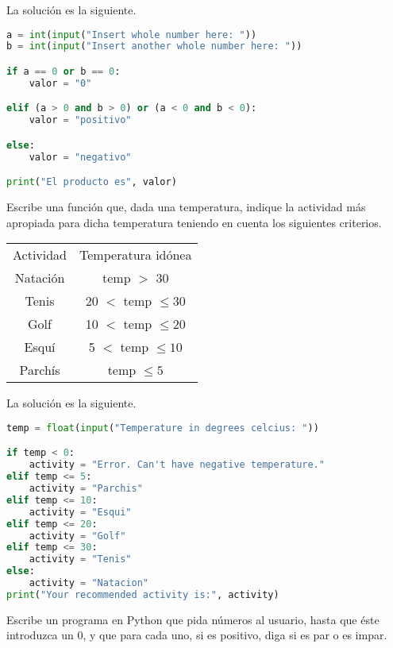 \documentclass{article}
\begin{document}
\begin{sol}
La solución es la siguiente.
\begin{lstlisting}[language = Python]
a = int(input("Insert whole number here: "))
b = int(input("Insert another whole number here: "))

if a == 0 or b == 0: 
	valor = "0"

elif (a > 0 and b > 0) or (a < 0 and b < 0):
	valor = "positivo"

else:
	valor = "negativo"

print("El producto es", valor)
\end{lstlisting}
\end{sol}

\begin{ej}
Escribe una función que, dada una temperatura, indique la actividad más apropiada para dicha temperatura teniendo en cuenta los siguientes criterios.
\begin{center}
\begin{tabular}{c c}
	Actividad & Temperatura idónea \\
	Natación & temp $\displaystyle > $  30 \\
	Tenis & 20 $\displaystyle < $  temp $\displaystyle \leq 30 $  \\
	Golf & 10 $\displaystyle < $  temp $\displaystyle \leq 20 $  \\
	Esquí & 5 $\displaystyle < $  temp $\displaystyle \leq 10 $ \\
	Parchís & temp $\displaystyle \leq 5 $ 
\end{tabular}
\end{center}
\end{ej}

\begin{sol}
La solución es la siguiente.
\begin{lstlisting}[language = Python]
temp = float(input("Temperature in degrees celcius: "))

if temp < 0: 
	activity = "Error. Can't have negative temperature."
elif temp <= 5: 
	activity = "Parchis"
elif temp <= 10:
	activity = "Esqui"
elif temp <= 20: 
	activity = "Golf"
elif temp <= 30:
	activity = "Tenis"
else:
	activity = "Natacion"
print("Your recommended activity is:", activity)
\end{lstlisting}
\end{sol}

\begin{ej}
Escribe un programa en Python que pida números al usuario, hasta que éste introduzca un 0, y que para cada uno, si es positivo, diga si es par o es impar. 
\end{ej}
\end{document}
